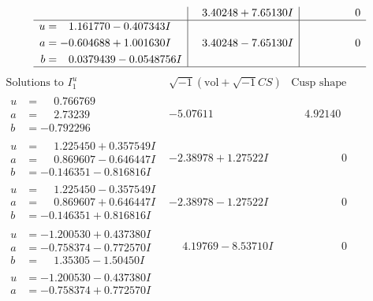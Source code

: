 \documentclass[1p]{elsarticle_modified}
\theoremstyle{definition}
\newcommand{\I}{\sqrt{-1}}
\begin{document}
$$\begin{array}{c|c|c}
 & \phantom{-}3.40248 + 7.65130 I & \phantom{-0.000000 } 0 \\ \hline\begin{aligned}
u &= \phantom{-}1.161770 - 0.407343 I \\
a &= -0.604688 + 1.001630 I \\
b &= \phantom{-}0.0379439 - 0.0548756 I\end{aligned}
 & \phantom{-}3.40248 - 7.65130 I & \phantom{-0.000000 } 0\\
 \hline 
 \end{array}$$\newpage$$\begin{array}{c|c|c}  
\text{Solutions to }I^u_{1}& \I (\text{vol} + \sqrt{-1}CS) & \text{Cusp shape}\\
 \hline 
\begin{aligned}
u &= \phantom{-}0.766769\phantom{ +0.000000I} \\
a &= \phantom{-}2.73239\phantom{ +0.000000I} \\
b &= -0.792296\phantom{ +0.000000I}\end{aligned}
 & -5.07611\phantom{ +0.000000I} & \phantom{-}4.92140\phantom{ +0.000000I} \\ \hline\begin{aligned}
u &= \phantom{-}1.225450 + 0.357549 I \\
a &= \phantom{-}0.869607 - 0.646447 I \\
b &= -0.146351 - 0.816816 I\end{aligned}
 & -2.38978 + 1.27522 I & \phantom{-0.000000 } 0 \\ \hline\begin{aligned}
u &= \phantom{-}1.225450 - 0.357549 I \\
a &= \phantom{-}0.869607 + 0.646447 I \\
b &= -0.146351 + 0.816816 I\end{aligned}
 & -2.38978 - 1.27522 I & \phantom{-0.000000 } 0 \\ \hline\begin{aligned}
u &= -1.200530 + 0.437380 I \\
a &= -0.758374 - 0.772570 I \\
b &= \phantom{-}1.35305 - 1.50450 I\end{aligned}
 & \phantom{-}4.19769 - 8.53710 I & \phantom{-0.000000 } 0 \\ \hline\begin{aligned}
u &= -1.200530 - 0.437380 I \\
a &= -0.758374 + 0.772570 I \\

\end{aligned}
\end{array}$$
\end{document}
